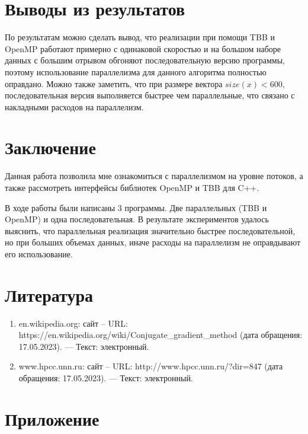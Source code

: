 \documentclass[14pt, russian]{extarticle}
\begin{document}
        \section{Выводы из результатов}

        По результатам можно сделать вывод, что реализации при помощи TBB и OpenMP работают примерно с одинаковой скоростью и на большом наборе данных с большим отрывом обгоняют последовательную версию программы, поэтому использование параллелизма для данного алгоритма полностью оправдано. Можно также заметить, что при размере вектора $size(x) < 600$, последовательная версия выполняется быстрее чем параллельные, что связано с накладными расходов на параллелизм.

        \newpage

        \section{Заключение}
        Данная работа позволила мне ознакомиться с параллелизмом на уровне
        потоков, а также рассмотреть интерфейсы библиотек OpenMP и TBB для
        C++.
        \par
        В ходе работы были написаны 3 программы. Две параллельных (TBB и OpenMP) и одна последовательная. В результате экспериментов удалось выяснить, что параллельная реализация значительно быстрее последовательной, но при больших объемах данных, иначе расходы на параллелизм не оправдывают его использование.

        \newpage

	\section{Литература}
	\begin{enumerate}
		\item en.wikipedia.org: сайт – URL:\\  
            https://en.wikipedia.org/wiki/Conjugate\_gradient\_method
            (дата обращения: 17.05.2023). 
            —  Текст: электронный.
		\item www.hpcc.unn.ru: сайт – URL: http://www.hpcc.unn.ru/?dir=847 (дата обращения: 17.05.2023). —  Текст: электронный.
	\end{enumerate}
	\newpage

	\section{Приложение}
\end{document}
